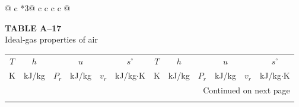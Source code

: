 \documentclass[12pt,a3paper]{article}
\begin{document}
\begin{enumerate}
\begin{center}
\begin{longtable}{@{} c *{3}{@{\hspace{12pt}} c c c c} @{}}
\end{longtable}
\end{center}

\noindent\textbf{\Large TABLE A--17} \\
\noindent Ideal-gas properties of air
\vspace{0.3cm}

\begin{center}
\footnotesize
\begin{longtable}{cccccc|cccccc}
\toprule\toprule
$T$ & $h$ & & $u$ & & $s^\circ$ & $T$ & $h$ & & $u$ & & $s^\circ$ \\
K & kJ/kg & $P_r$ & kJ/kg & $v_r$ & kJ/kg$\cdot$K & K & kJ/kg & $P_r$ & kJ/kg & $v_r$ & kJ/kg$\cdot$K \\
\midrule
\endhead

\midrule
\multicolumn{12}{r}{{Continued on next page}} \\
\bottomrule
\endfoot

\bottomrule\bottomrule
\endlastfoot


\end{longtable}
\end{center}
\end{enumerate}
\end{document}
